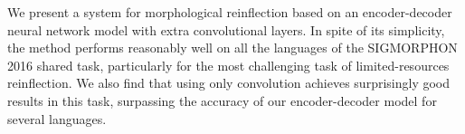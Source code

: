 We present a system for morphological reinflection based on an encoder-decoder neural network model with extra convolutional layers. In spite of its simplicity, the method performs reasonably well on all the languages of the SIGMORPHON 2016 shared task, particularly for the most challenging task of limited-resources reinflection. We also find that using only convolution achieves surprisingly good results in this task, surpassing the accuracy of our encoder-decoder model for several languages.

